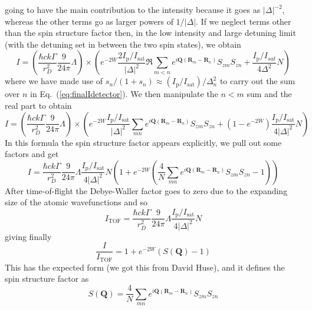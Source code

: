 \documentclass[11pt,letter]{article}
\newcommand{\bv}[1]{\ensuremath{\bm{#1}}}
\begin{document}
going to have the main contribution to the intensity because it goes as $
|\Delta|^{-2} $, whereas the other terms go as larger powers of $1/|\Delta|$.  
If we neglect terms other than the spin structure factor then,  in the low intensity and large detuning limit (with the detuning set in between the two spin states), we obtain 
\begin{equation}
 I  =
 \left( 
 \frac{\hbar c k \Gamma}{r_{D}^{2}}  
     \frac{9}{24\pi} \Lambda 
  \right) \times 
  \left(
    e^{-2W} \frac{2I_{\mathrm{p}}/I_{\mathrm{sat}}}{ |\Delta|^{2} }  \Re \sum_{m<n}  
      e^{ i \bv{Q}( \bv{R}_{m} - \bv{R}_{n} ) } 
      S_{zm}S_{zn}  
  +  \frac{I_{\mathrm{p}}/I_{sat}}{ 4 \Delta^{2} } N
  \right)
\end{equation}
where we have made use of $s_{n}/(1+s_{n}) \approx (I_{\mathrm{p}}/I_{\mathrm{sat}})/ \Delta_{n}^{2}$ to carry out the sum over $n$ in Eq.~(\ref{eq:finalIdetector}).  We then manipulate the $n<m$ sum and the real part to obtain
\begin{equation}
 I  =
 \left( 
 \frac{\hbar c k \Gamma}{r_{D}^{2}}  
     \frac{9}{24\pi} \Lambda 
  \right) \times 
  \left(
    e^{-2W} \frac{I_{\mathrm{p}}/I_{\mathrm{sat}}}{ |\Delta|^{2} }  \sum_{m n}  
      e^{ i \bv{Q}( \bv{R}_{m} - \bv{R}_{n} ) } 
      S_{zm}S_{zn}  
  + (1- e^{-2W}) \frac{I_{\mathrm{p}}/I_{\mathrm{sat}}}{ 4|\Delta|^{2} }  N
  \right)
\end{equation}
In this formula the spin structure factor appears explicitly, we pull out some factors and get  
\begin{equation}
 I  =
 \frac{\hbar c k \Gamma}{r_{D}^{2}}  
     \frac{9}{24\pi} \Lambda
 \frac{I_{\mathrm{p}}/I_{\mathrm{sat}}}{ 4|\Delta|^{2} }  N
  \left(
   1 + 
    e^{-2W} \left( \frac{4}{ N }  \sum_{m n}  
      e^{ i \bv{Q}( \bv{R}_{m} - \bv{R}_{n} ) } 
      S_{zm}S_{zn}  - 1 \right )
     \right)
\end{equation}
After time-of-flight the Debye-Waller factor goes to zero due to the expanding size of the atomic wavefunctions and so  
\begin{equation}
 I_{\mathrm{TOF}} =
 \frac{\hbar c k \Gamma}{r_{D}^{2}}  
     \frac{9}{24\pi} \Lambda
 \frac{I_{\mathrm{p}}/I_{\mathrm{sat}}}{ 4|\Delta|^{2} }  N
\end{equation}
giving finally 
\begin{equation}
 \frac{I}{I_{\mathrm{TOF}}} = 1 +  e^{-2W}( S(\bv{Q}) - 1 )
 \label{eq:lowIntensityBragg} 
\end{equation}
This has the expected form (we got this from David Huse), and it defines the spin structure factor as 
\begin{equation}
    S(\bv{Q}) =  \frac{4}{ N }  \sum_{m n}  
      e^{ i \bv{Q}( \bv{R}_{m} - \bv{R}_{n} ) } 
      S_{zm}S_{zn}  
\end{equation}
\end{document}
